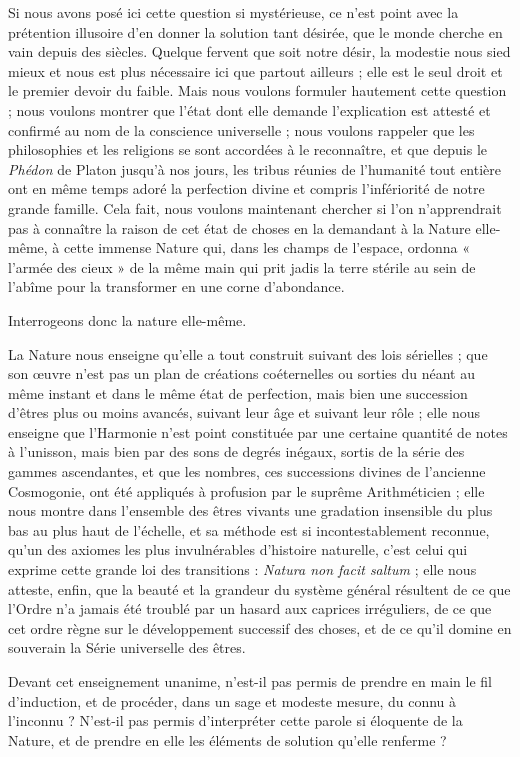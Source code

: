 \documentclass[a4paper, 11pt, oneside]{article}
\begin{document}
Si nous avons posé ici cette question si mystérieuse, ce n'est point avec la prétention illusoire d'en donner la solution tant désirée, que le monde cherche en vain depuis des siècles. Quelque fervent que soit notre désir, la modestie nous sied mieux et nous est plus nécessaire ici que partout ailleurs ; elle est le seul droit et le premier devoir du faible. Mais nous voulons formuler hautement cette question ; nous voulons montrer que l'état dont elle demande l'explication est attesté et confirmé au nom de la conscience universelle ; nous voulons rappeler que les philosophies et les religions se sont accordées à le reconnaître, et que depuis le \emph{Phédon} de Platon jusqu'à nos jours, les tribus réunies de l'humanité tout entière ont en même temps adoré la perfection divine et compris l'infériorité de notre grande famille. Cela fait, nous voulons maintenant chercher si l'on n'apprendrait pas à connaître la raison de cet état de choses en la demandant à la Nature elle-même, à cette immense Nature qui, dans les champs de l'espace, ordonna « l'armée des cieux » de la même main qui prit jadis la terre stérile au sein de l'abîme pour la transformer en une corne d'abondance.

Interrogeons donc la nature elle-même.

La Nature nous enseigne qu'elle a tout construit suivant des lois sérielles ; que son œuvre n'est pas un plan de créations coéternelles ou sorties du néant au même instant et dans le même état de perfection, mais bien une succession d'êtres plus ou moins avancés, suivant leur âge et suivant leur rôle ; elle nous enseigne que l'Harmonie n'est point constituée par une certaine quantité de notes à l'unisson, mais bien par des sons de degrés inégaux, sortis de la série des gammes ascendantes, et que les nombres, ces successions divines de l'ancienne Cosmogonie, ont été appliqués à profusion par le suprême Arithméticien ; elle nous montre dans l'ensemble des êtres vivants une gradation insensible du plus bas au plus haut de l'échelle, et sa méthode est si incontestablement reconnue, qu'un des axiomes les plus invulnérables d'histoire naturelle, c'est celui qui exprime cette grande loi des transitions : \emph{Natura non facit saltum} ; elle nous atteste, enfin, que la beauté et la grandeur du système général résultent de ce que l'Ordre n'a jamais été troublé par un hasard aux caprices irréguliers, de ce que cet ordre règne sur le développement successif des choses, et de ce qu'il domine en souverain la Série universelle des êtres.

Devant cet enseignement unanime, n'est-il pas permis de prendre en main le fil d'induction, et de procéder, dans un sage et modeste mesure, du connu à l'inconnu ? N'est-il pas permis d'interpréter cette parole si éloquente de la Nature, et de prendre en elle les éléments de solution qu'elle renferme ?
\end{document}
